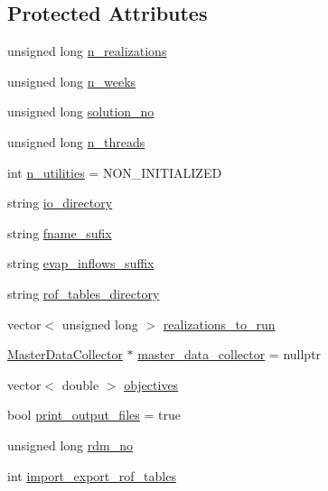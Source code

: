 \subsection*{Protected Attributes}
\begin{DoxyCompactItemize}
\item 
unsigned long \mbox{\hyperlink{classProblem_a270a5672643bfe09e52e0f24e1884136}{n\+\_\+realizations}}
\item 
unsigned long \mbox{\hyperlink{classProblem_ac7513bb0ecdfa4bbb7d2ada3595d71ec}{n\+\_\+weeks}}
\item 
unsigned long \mbox{\hyperlink{classProblem_a7ca15cdcbff926ddca25bdee5984ffe5}{solution\+\_\+no}}
\item 
unsigned long \mbox{\hyperlink{classProblem_a3303a162d648e8ae16153b57b5b4054f}{n\+\_\+threads}}
\item 
int \mbox{\hyperlink{classProblem_a4ca86ba2f568d232cf0421d39acff113}{n\+\_\+utilities}} = N\+O\+N\+\_\+\+I\+N\+I\+T\+I\+A\+L\+I\+Z\+ED
\item 
string \mbox{\hyperlink{classProblem_ac58848a0d808cf040c3fb3676b4a236f}{io\+\_\+directory}}
\item 
string \mbox{\hyperlink{classProblem_a59444139a907aaf4c6159caed46c8118}{fname\+\_\+sufix}}
\item 
string \mbox{\hyperlink{classProblem_a1ff3958eef8bfb851a84ce0772104dca}{evap\+\_\+inflows\+\_\+suffix}}
\item 
string \mbox{\hyperlink{classProblem_abc641b49a4defb0dbabafbf3f9dbca6e}{rof\+\_\+tables\+\_\+directory}}
\item 
vector$<$ unsigned long $>$ \mbox{\hyperlink{classProblem_af9ed9265d0d2b4918bd468d717429de1}{realizations\+\_\+to\+\_\+run}}
\item 
\mbox{\hyperlink{classMasterDataCollector}{Master\+Data\+Collector}} $\ast$ \mbox{\hyperlink{classProblem_a6cd1db1d587a449985d6514390ba8c96}{master\+\_\+data\+\_\+collector}} = nullptr
\item 
vector$<$ double $>$ \mbox{\hyperlink{classProblem_a72750ee8c8117f5ee9b190a359d6a60d}{objectives}}
\item 
bool \mbox{\hyperlink{classProblem_a3372a73270ce989f5d2056cace66215b}{print\+\_\+output\+\_\+files}} = true
\item 
unsigned long \mbox{\hyperlink{classProblem_a9e780729b6be5229c5bfa1e38c99cfa5}{rdm\+\_\+no}}
\item 
int \mbox{\hyperlink{classProblem_ac5a286f34cec786a0ad56c77783a201c}{import\+\_\+export\+\_\+rof\+\_\+tables}}

\end{DoxyCompactItemize}
